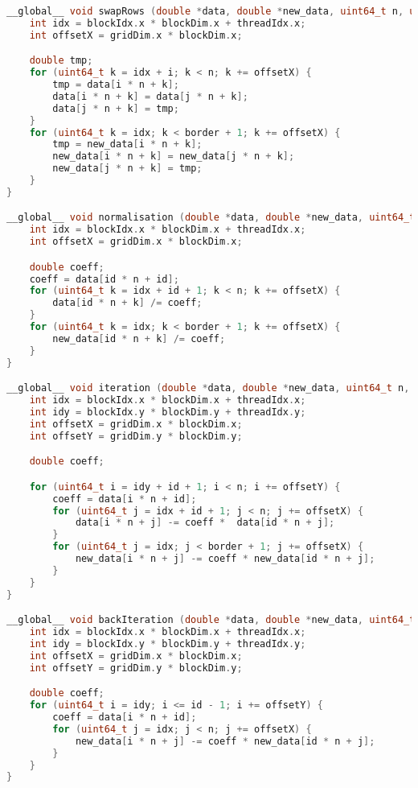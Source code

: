 \begin{lstlisting}[basicstyle=\normalfont, language=C++]
__global__ void swapRows (double *data, double *new_data, uint64_t n, uint64_t i, uint64_t j, uint64_t border) {
    int idx = blockIdx.x * blockDim.x + threadIdx.x;
    int offsetX = gridDim.x * blockDim.x;

    double tmp;
    for (uint64_t k = idx + i; k < n; k += offsetX) {
        tmp = data[i * n + k];
        data[i * n + k] = data[j * n + k];
        data[j * n + k] = tmp;
    }
    for (uint64_t k = idx; k < border + 1; k += offsetX) {
        tmp = new_data[i * n + k];
        new_data[i * n + k] = new_data[j * n + k];
        new_data[j * n + k] = tmp;
    }
}

__global__ void normalisation (double *data, double *new_data, uint64_t n, uint64_t id, uint64_t border) {
    int idx = blockIdx.x * blockDim.x + threadIdx.x;
    int offsetX = gridDim.x * blockDim.x;

    double coeff;
    coeff = data[id * n + id];
    for (uint64_t k = idx + id + 1; k < n; k += offsetX) {
        data[id * n + k] /= coeff;
    }
    for (uint64_t k = idx; k < border + 1; k += offsetX) {
        new_data[id * n + k] /= coeff;
    }
}

__global__ void iteration (double *data, double *new_data, uint64_t n, uint64_t id, uint64_t border) {
    int idx = blockIdx.x * blockDim.x + threadIdx.x;
    int idy = blockIdx.y * blockDim.y + threadIdx.y;
    int offsetX = gridDim.x * blockDim.x;
    int offsetY = gridDim.y * blockDim.y;

    double coeff;

    for (uint64_t i = idy + id + 1; i < n; i += offsetY) {
        coeff = data[i * n + id];
        for (uint64_t j = idx + id + 1; j < n; j += offsetX) {
            data[i * n + j] -= coeff *  data[id * n + j];
        }
        for (uint64_t j = idx; j < border + 1; j += offsetX) {
            new_data[i * n + j] -= coeff * new_data[id * n + j];
        }
    }
}

__global__ void backIteration (double *data, double *new_data, uint64_t n, uint64_t id) {
    int idx = blockIdx.x * blockDim.x + threadIdx.x;
    int idy = blockIdx.y * blockDim.y + threadIdx.y;
    int offsetX = gridDim.x * blockDim.x;
    int offsetY = gridDim.y * blockDim.y;

    double coeff;
    for (uint64_t i = idy; i <= id - 1; i += offsetY) {
        coeff = data[i * n + id];
        for (uint64_t j = idx; j < n; j += offsetX) {
            new_data[i * n + j] -= coeff * new_data[id * n + j];
        }
    }
}
\end{lstlisting}

\vspace{15pt}

